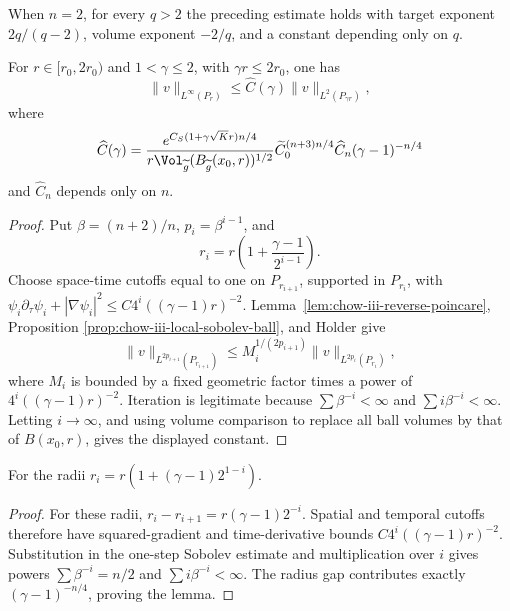 \begin{remark}
\label{rem:chow-iii-two-dimensional-local-sobolev}
When \(n=2\), for every \(q>2\) the preceding estimate holds with target
exponent \(2q/(q-2)\), volume exponent \(-2/q\), and a constant depending
only on \(q\).
\end{remark}

\begin{lemma}
\label{lem:chow-iii-moser-cylinder-iteration}
For \(r\in[r_0,2r_0)\) and \(1<\gamma\leq2\), with
\(\gamma r\leq2r_0\), one has
\[
 \|v\|_{L^\infty(P_r)}\leq \widehat C(\gamma)
 \|v\|_{L^2(P_{\gamma r})},
\]
where
\[
 \widehat C(\gamma)=
 \frac{e^{C_S(1+\gamma\sqrt K r)n/4}}
 {r\Vol_{\widetilde g}(B_{\widetilde g}(x_0,r))^{1/2}}
 \widetilde C_0^{(n+3)n/4}\widehat C_n
 (\gamma-1)^{-n/4}
\]
and \(\widehat C_n\) depends only on \(n\).
\end{lemma}
\begin{proof}
\sketch Put \(\beta=(n+2)/n\), \(p_i=\beta^{i-1}\), and
\[
 r_i=r\left(1+\frac{\gamma-1}{2^{i-1}}\right).
\]
Choose space-time cutoffs equal to one on \(P_{r_{i+1}}\), supported in
\(P_{r_i}\), with
\(\psi_i\partial_\tau\psi_i+|\nabla\psi_i|^2
 \leq C4^i((\gamma-1)r)^{-2}\).
Lemma~\ref{lem:chow-iii-reverse-poincare}, Proposition
\ref{prop:chow-iii-local-sobolev-ball}, and Holder give
\[
 \|v\|_{L^{2p_{i+1}}(P_{r_{i+1}})}
 \leq M_i^{1/(2p_{i+1})}
 \|v\|_{L^{2p_i}(P_{r_i})},
\]
where \(M_i\) is bounded by a fixed geometric factor times a power of
\(4^i((\gamma-1)r)^{-2}\).  Iteration is legitimate because
\(\sum\beta^{-i}<\infty\) and \(\sum i\beta^{-i}<\infty\).  Letting
\(i\to\infty\), and using volume comparison to replace all ball volumes by
that of \(B(x_0,r)\), gives the displayed constant.
\end{proof}

\begin{example}
\label{ex:chow-iii-rescaled-moser-cylinder-iteration}
For the radii
\(r_i=r(1+(\gamma-1)2^{1-i})\).
\end{example}
\begin{proof}
\sketch For these radii,
\(r_i-r_{i+1}=r(\gamma-1)2^{-i}\).  Spatial and temporal cutoffs therefore
have squared-gradient and time-derivative bounds
\(C4^i((\gamma-1)r)^{-2}\).  Substitution in the one-step Sobolev estimate
and multiplication over \(i\) gives powers
\(\sum\beta^{-i}=n/2\) and \(\sum i\beta^{-i}<\infty\).  The radius gap
contributes exactly \((\gamma-1)^{-n/4}\), proving the lemma.
\end{proof}

